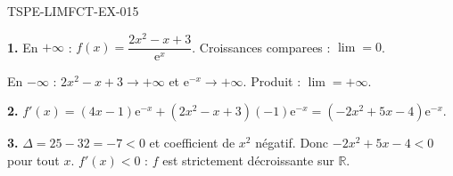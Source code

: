 \begin{corrige}{TSPE-LIMFCT-EX-015}

\textbf{1.} En $+\infty$ : $f(x) = \dfrac{2x^2-x+3}{\mathrm{e}^x}$. Croissances comparees : $\boxed{\lim = 0}$.

En $-\infty$ : $2x^2-x+3 \to +\infty$ et $\mathrm{e}^{-x} \to +\infty$. Produit : $\boxed{\lim = +\infty}$.

\textbf{2.} $f'(x) = (4x-1)\mathrm{e}^{-x} + (2x^2-x+3)(-1)\mathrm{e}^{-x} = (-2x^2+5x-4)\mathrm{e}^{-x}$.

\textbf{3.} $\Delta = 25 - 32 = -7 < 0$ et coefficient de $x^2$ négatif. Donc $-2x^2+5x-4 < 0$ pour tout $x$. $f'(x) < 0$ : $f$ est strictement décroissante sur $\mathbb{R}$.

\end{corrige}

